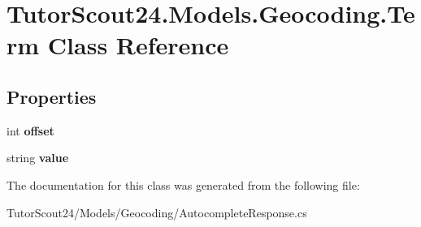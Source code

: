 \hypertarget{class_tutor_scout24_1_1_models_1_1_geocoding_1_1_term}{}\section{Tutor\+Scout24.\+Models.\+Geocoding.\+Term Class Reference}
\label{class_tutor_scout24_1_1_models_1_1_geocoding_1_1_term}
\subsection*{Properties}
\begin{DoxyCompactItemize}
\item 
\mbox{\label{class_tutor_scout24_1_1_models_1_1_geocoding_1_1_term_ab65945eca06421e655f79fb65bf582b6}} 
int {\bfseries offset}
\item 
\mbox{\label{class_tutor_scout24_1_1_models_1_1_geocoding_1_1_term_a2be15b8bc7e724b196a9302093cfeda2}} 
string {\bfseries value}
\end{DoxyCompactItemize}


The documentation for this class was generated from the following file\+:\begin{DoxyCompactItemize}
\item 
Tutor\+Scout24/\+Models/\+Geocoding/Autocomplete\+Response.\+cs\end{DoxyCompactItemize}
